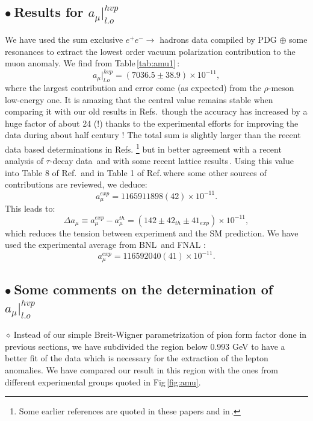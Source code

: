\documentclass[review]{elsarticle}
\def\beq{\begin{equation}}
\def\eeq{\end{equation}}
\def\b{$\bullet~$}
\def\d{$\diamond~$}
\begin{document}
\subsection*{\b Results for $a_\mu\vert^{hvp}_{l.o}$} 
We have used  the sum  exclusive $e^+e^-\to$ hadrons data compiled by PDG $\oplus$ some resonances to extract the 
lowest order vacuum polarization contribution to the muon anomaly. We find from Table\,\ref{tab:amu1}\,:
\beq
a_\mu\vert^{hvp}_{l.o}=(7036.5\pm 38.9)\times 10^{-11},
\eeq
where the largest contribution and error come (as expected) from the $\rho$-meson low-energy one. It is amazing that the central value remains stable when comparing it with our old results in Refs.\,\cite{CALMET,SN76,SN78,SNamu} though the accuracy has increased by a huge factor of about 24 (!) thanks to the experimental efforts for improving the data during about half century !  The total sum is slightly larger  than the recent data based determinations in Refs.\,\cite{NOMURA,DAVIER2}\,\footnote{Some earlier references are quoted in these papers and in\,\cite{SNamu}.} but in better agreement with a recent analysis of $\tau$-decay data\,\cite{MIRANDA}  and with some recent lattice results\,\cite{RAF,GM2,LATTICE}.  Using this value into Table 8 of Ref.\,\cite{KNECHT} and in Table 1 of Ref.\,\cite{GM2}where some other sources of contributions are reviewed, we deduce:
\beq
a_\mu^{exp}= 1165911898(42)\times 10^{-11}.
\eeq
This leads to:
\beq
\Delta a_\mu\equiv a_\mu^{exp}-a_\mu^{th} = (142\pm 42_{th}\pm 41_{exp})\times 10^{-11},
\label{eq:amu-sm}
\eeq
which reduces the tension between experiment and the SM prediction. We have used the experimental average from BNL\,\cite{BNL} and FNAL\,\cite{FNAL}\,:
\beq
a_\mu^{exp}= 116592040(41)\times 10^{-11}.
\eeq
\subsection*{\b Some comments on the determination of  $a_\mu\vert^{hvp}_{l.o}$} 
\d  Instead of our simple Breit-Wigner parametrization of pion form factor done in previous sections, we have subdivided the region below 0.993 GeV to have a better fit of the data which is necessary for the extraction of the lepton anomalies. 
We have compared our result in this region with  the ones from different experimental groups quoted in Fig\,\ref{fig:amu}.
\end{document}

